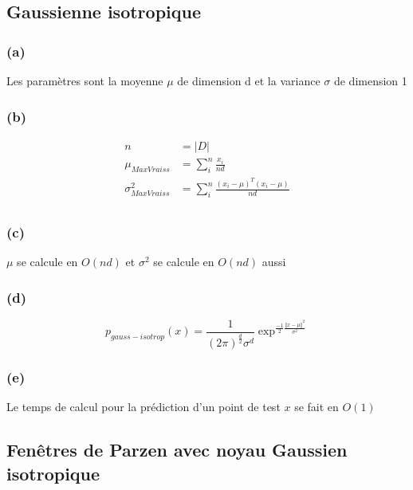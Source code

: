\documentclass{article}
\begin{document}
	\subsection{Gaussienne isotropique}
	
	\subsubsection*{(a)}
	Les paramètres sont la moyenne $\mu$ de dimension d et la variance $\sigma$ de dimension 1 \\
	
	
	\subsubsection*{(b)}
	\begin{equation}
	\begin{split}
		n &= |D| \\
		\mu_{MaxVraiss} &= \sum_{i}^{n} \frac{x_{i}}{nd} \\
		\sigma_{MaxVraiss}^{2} &= \sum_{i}^{n} \frac{(x_{i}- \mu)^{T}(x_{i} - \mu)}{nd} \\
	\end{split}
	\end{equation}
	
	\subsubsection*{(c)}
	$\mu$ se calcule en $O(nd)$  et $\sigma^{2} $ se calcule en $O(nd)$ aussi\\
	\subsubsection*{(d)}
	
	\begin{equation}
		p_{gauss-isotrop}(x) = 
		\frac{1}{(2\pi)^{\frac{d}{2}}\sigma^d}\exp^{\frac{-1}{2}\frac{\Vert x-\mu\Vert^2}{\sigma^2}}
	\end{equation}
	
	\subsubsection*{(e)}
	Le temps de calcul pour la prédiction d'un point de test $x$ se fait en $O(1)$
	
	\subsection{Fenêtres de Parzen avec noyau Gaussien isotropique}
	
\end{document}
